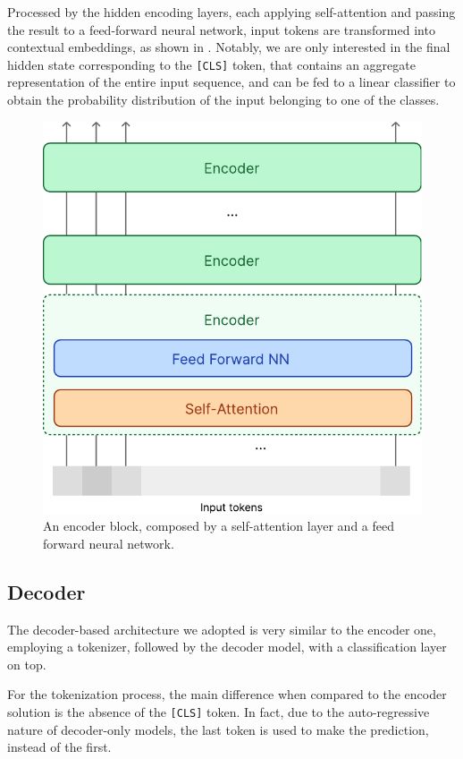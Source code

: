 \documentclass[11pt]{article}
\begin{document}
Processed by the hidden encoding layers, each applying self-attention and passing the result to a feed-forward
neural network, input tokens are transformed into contextual embeddings, as shown in . Notably, we are only interested in
the final hidden state corresponding to the \texttt{[CLS]} token, that contains an aggregate representation of
the entire input sequence, and can be fed to a linear classifier to obtain the probability distribution of the
input belonging to one of the classes.

\begin{figure}
  \centering
  \includegraphics[width=0.8\linewidth]{figures/encoder-block.pdf}
  \caption{
    An encoder block, composed by a self-attention layer and a feed forward neural network.
  }
  \label{fig:encoder-block}
\end{figure}

\subsection{Decoder}
The decoder-based architecture we adopted is very similar to the encoder one, employing a tokenizer, followed
by the decoder model, with a classification layer on top.

For the tokenization process, the main difference when compared to the encoder solution is the absence of the \texttt{[CLS]} token. 
In fact, due to the auto-regressive nature
of decoder-only models, the last token is used to make the prediction, instead of the first.
\end{document}
